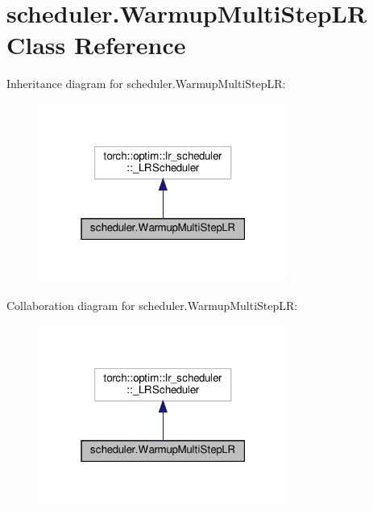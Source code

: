 \hypertarget{classscheduler_1_1WarmupMultiStepLR}{}\section{scheduler.\+Warmup\+Multi\+Step\+LR Class Reference}
\label{classscheduler_1_1WarmupMultiStepLR}


Inheritance diagram for scheduler.\+Warmup\+Multi\+Step\+LR\+:
\nopagebreak
\begin{figure}[H]
\begin{center}
\leavevmode
\includegraphics[width=232pt]{classscheduler_1_1WarmupMultiStepLR__inherit__graph}
\end{center}
\end{figure}


Collaboration diagram for scheduler.\+Warmup\+Multi\+Step\+LR\+:
\nopagebreak
\begin{figure}[H]
\begin{center}
\leavevmode
\includegraphics[width=232pt]{classscheduler_1_1WarmupMultiStepLR__coll__graph}
\end{center}
\end{figure}
